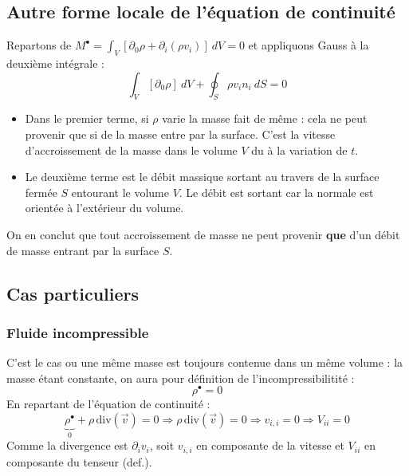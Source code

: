 \subsection{Autre forme locale de l'équation de continuité}
Repartons de $M^\bullet = \int_V [\partial_0\rho + \partial_i(\rho v_i)]\ dV = 0$ et 
appliquons Gauss à la deuxième intégrale :
\begin{equation}
	\int_V [\partial_0\rho]\ dV + \oint_S \rho v_in_i\ dS = 0
\end{equation}
\begin{itemize}
	\item Dans le premier terme, si $\rho$ varie la masse fait de même : cela ne peut 
	      provenir que si de la masse entre par la surface. C'est la vitesse d'accroissement de
	      la masse dans le volume $V$ du à la variation de $t$.
	\item Le deuxième terme est le débit massique sortant au travers de la surface fermée 
	      $S$ entourant le volume $V$. Le débit est sortant car la normale est orientée à l'extérieur 
	      du volume.
\end{itemize}
On en conclut que tout accroissement de masse ne peut provenir \textbf{que} d'un débit
de masse entrant par la surface $S$.


\subsection{Cas particuliers}
\subsubsection{Fluide incompressible}
C'est le cas ou une même masse est toujours contenue dans un même volume : la 
masse étant constante, on aura pour définition de l'incompressibilitité :
\begin{equation}
	\rho^\bullet = 0
\end{equation}
En repartant de l'équation de continuité : 
\begin{equation}
	\underbrace{\rho^\bullet}_{0} +\rho\,\text{div}(\vec v) = 0 \Rightarrow
	\rho\,\text{div}(\vec v) = 0 \Rightarrow v_{i,i} = 0 \Rightarrow V_{ii} = 0
\end{equation}
Comme la divergence est $\partial_i v_i$, soit $v_{i,i}$ en composante de la vitesse et
$V_{ii}$ en composante du tenseur (def.).
    
    
